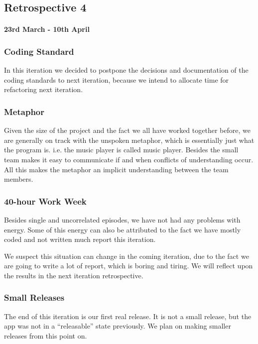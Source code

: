 \subsection*{Retrospective 4}
\paragraph{23rd March - 10th April}

\subsubsection{Coding Standard}
In this iteration we decided to postpone the decisions and documentation of the coding standards to next iteration, because we intend to allocate time for refactoring next iteration. 

\subsubsection{Metaphor}
Given the size of the project and the fact we all have worked together before, we are generally on track with the unspoken metaphor, which is essentially just what the program is. i.e. the music player is called music player.
Besides the small team makes it easy to communicate if and when conflicts of understanding occur.
All this makes the metaphor an implicit understanding between the team members.

\subsubsection{40-hour Work Week}
Besides single and uncorrelated episodes, we have not had any problems with energy.
Some of this energy can also be attributed to the fact we have mostly coded and not written much report this iteration. 

We suspect this situation can change in the coming iteration, due to the fact we are going to write a lot of report, which is boring and tiring. We will reflect upon the results in the next iteration retrospective.

\subsubsection{Small Releases}
The end of this iteration is our first real release. It is not a small release, but the app was not in a “releasable” state previously. We plan on making smaller releases from this point on.


